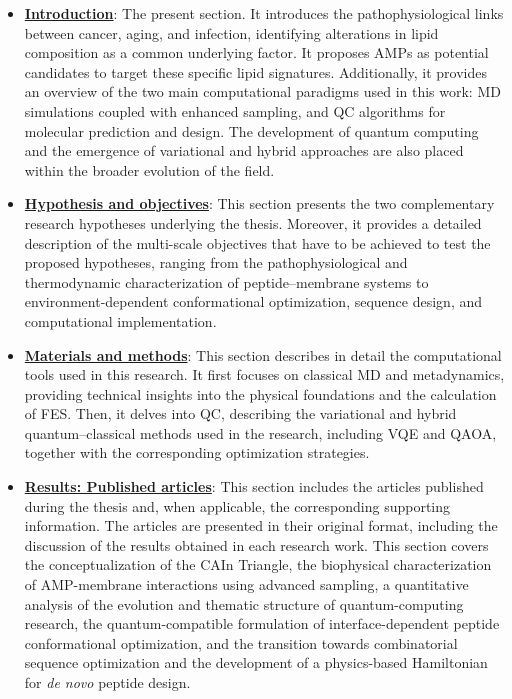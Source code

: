 \begin{itemize}
    \item \textbf{\hyperref[chap:intro]{Introduction}}: The present section. It introduces the pathophysiological links between cancer, aging, and infection, identifying alterations in lipid composition as a common underlying factor. It proposes AMPs as potential candidates to target these specific lipid signatures. Additionally, it provides an overview of the two main computational paradigms used in this work: MD simulations coupled with enhanced sampling, and QC algorithms for molecular prediction and design. The development of quantum computing and the emergence of variational and hybrid approaches are also placed within the broader evolution of the field.
    \item \textbf{\hyperref[chap:objectives]{Hypothesis and objectives}}: This section presents the two complementary research hypotheses underlying the thesis. Moreover, it provides a detailed description of the multi-scale objectives that have to be achieved to test the proposed hypotheses, ranging from the pathophysiological and thermodynamic characterization of peptide–membrane systems to environment-dependent conformational optimization, sequence design, and computational implementation.
    \item \textbf{\hyperref[methods]{Materials and methods}}: This section describes in detail the computational tools used in this research. It first focuses on classical MD and metadynamics, providing technical insights into the physical foundations and the calculation of FES. Then, it delves into QC, describing the variational and hybrid quantum–classical methods used in the research, including VQE and QAOA, together with the corresponding optimization strategies.

    \item \textbf{\hyperref[chap:results]{Results: Published articles}}: This section includes the articles published during the thesis and, when applicable, the corresponding supporting information. The articles are presented in their original format, including the discussion of the results obtained in each research work. This section covers the conceptualization of the CAIn Triangle, the biophysical characterization of AMP-membrane interactions using advanced sampling, a quantitative analysis of the evolution and thematic structure of quantum-computing research, the quantum-compatible formulation of interface-dependent peptide conformational optimization, and the transition towards combinatorial sequence optimization and the development of a physics-based Hamiltonian for \textit{de novo} peptide design.



\end{itemize}
